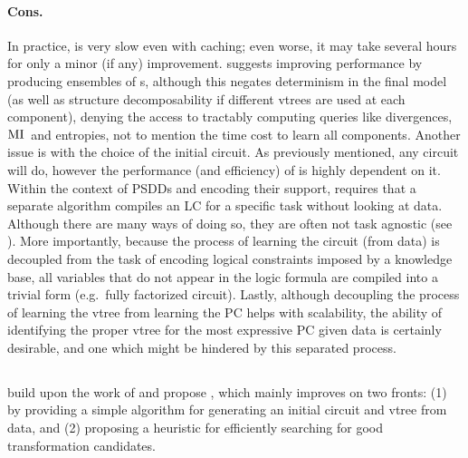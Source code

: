 \paragraph{Cons.} In practice,  is very slow even with caching; even worse, it
may take several hours for only a minor (if any) improvement. \citep{liang17} suggests improving
performance by producing ensembles of s, although this negates determinism in
the final model (as well as structure decomposability if different vtrees are used at each
component), denying the access to tractably computing queries like divergences, $\operatorname{\normalfont{MI}}{}$ and
entropies, not to mention the time cost to learn all components. Another issue is with the choice
of the initial circuit. As previously mentioned, any circuit will do, however the performance (and
efficiency) of  is highly dependent on it. Within the context of PSDDs and
encoding their support,  requires that a separate algorithm compiles an LC for
a specific task without looking at data. Although there are many ways of doing so, they are often
not task agnostic (see ). More importantly, because the process of learning the
circuit (from data) is decoupled from the task of encoding logical constraints imposed by a
knowledge base, all variables that do not appear in the logic formula are compiled into a trivial
form (e.g.\ fully factorized circuit). Lastly, although decoupling the process of learning the
vtree from learning the PC helps with scalability, the ability of identifying the proper vtree for
the most expressive PC given data is certainly desirable, and one which might be hindered by this
separated process.

\subsection{}

\citet{dang20} build upon the work of  and propose , which
mainly improves  on two fronts: (1) by providing a simple algorithm for
generating an initial circuit and vtree from data, and (2) proposing a heuristic for efficiently
searching for good transformation candidates.


